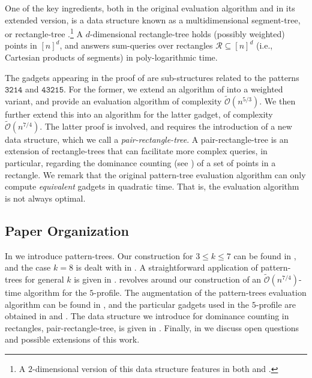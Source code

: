 \documentclass{article}
\theoremstyle{remark}
\newcommand{\Otilde}[1]{\widetilde{\mathcal{O}}\left( #1 \right)}
\theoremstyle{plain}
\begin{document}
One of the key ingredients, both in the original evaluation algorithm and in its extended version,
is a data structure known as a multidimensional segment-tree, or rectangle-tree \cite{jaja2005space,chazelle1988functional}.\footnote{A $2$-dimensional version of this data structure features in both \cite{even2021counting} and \cite{dudek2020counting}.}
A $d$-dimensional rectangle-tree holds (possibly weighted) points in $[n]^d$,
and answers sum-queries over rectangles $\mathcal{R} \subseteq [n]^d$ (i.e., Cartesian products of segments)
in poly-logarithmic time. 

The gadgets appearing in the proof of  are sub-structures related
to the patterns $\mathtt{3214}$ and $\mathtt{43215}$.
For the former, we extend an algorithm of \cite{even2021counting} into a weighted variant,
and provide an evaluation algorithm  of complexity $\widetilde{\mathcal{O}}(n^{5/3})$.
We then further extend this into an algorithm for the latter gadget, of complexity $\widetilde{\mathcal{O}}(n^{7/4})$.
The latter proof is involved, and requires the introduction of a new data structure, which we call
a \textit{pair-rectangle-tree}.
A pair-rectangle-tree is an extension of rectangle-trees that can facilitate more complex queries,
in particular, regarding the dominance counting (see \cite{jaja2005space, chazelle1987linear}) of a set of points in a rectangle.
We remark that the original pattern-tree evaluation algorithm 
can only compute \textit{equivalent} gadgets in quadratic time.
That is, the evaluation algorithm is not always optimal.

\subsection{Paper Organization}

In  we introduce pattern-trees.
Our construction for $3 \le k \le 7$ can be found in ,
and the case $k=8$ is dealt with in .
A straightforward application of pattern-trees for general $k$ is given in . 
 revolves around our construction of an $\Otilde{n^{7/4}}$-time
algorithm for the $5$-profile.
The augmentation of the pattern-trees evaluation algorithm can be found in ,
and the particular gadgets used in the $5$-profile are obtained in  and .
The data structure we introduce for dominance counting in rectangles, pair-rectangle-tree, is given in .
Finally, in  we discuss open questions and possible extensions of this work.
\end{document}
